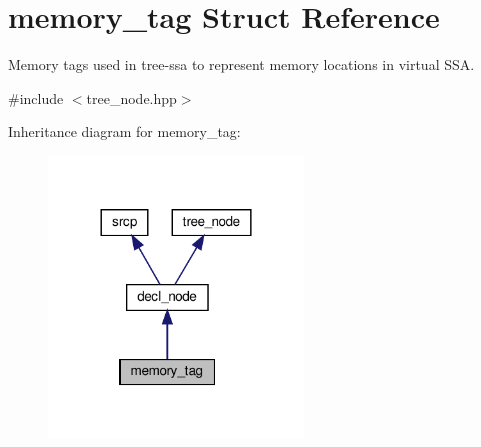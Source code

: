 \hypertarget{structmemory__tag}{}\section{memory\+\_\+tag Struct Reference}
\label{structmemory__tag}


Memory tags used in tree-\/ssa to represent memory locations in virtual S\+SA.  




{\ttfamily \#include $<$tree\+\_\+node.\+hpp$>$}



Inheritance diagram for memory\+\_\+tag\+:
\nopagebreak
\begin{figure}[H]
\begin{center}
\leavevmode
\includegraphics[width=192pt]{d3/dca/structmemory__tag__inherit__graph}
\end{center}
\end{figure}


